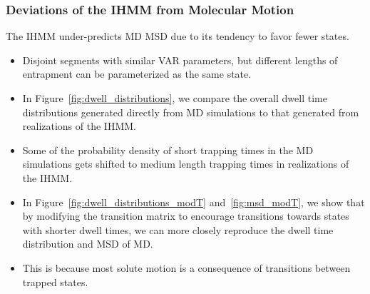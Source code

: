 \documentclass[journal=jpcbfk,manuscript=article]{achemso}
\begin{document}
  \subsubsection*{Deviations of the IHMM from Molecular Motion}
  
  \noindent The IHMM under-predicts MD MSD due to its tendency to favor fewer states.%
  \begin{itemize}
    \item Disjoint segments with similar VAR parameters, but different lengths of 
    entrapment can be parameterized as the same state.
    \item In Figure~\ref{fig:dwell_distributions}, we compare the overall dwell 
    time distributions generated directly from MD simulations to that generated from 
    realizations of the IHMM. 
    \item Some of the probability density of short trapping times in the MD simulations
    gets shifted to medium length trapping times in realizations of the IHMM.
    \item In Figure~\ref{fig:dwell_distributions_modT} and~\ref{fig:msd_modT}, we show 
    that by modifying the transition matrix to encourage transitions towards states with
    shorter dwell times, we can more closely reproduce the dwell time distribution and 
    MSD of MD.
    \item This is because most solute motion is a consequence of transitions between 
    trapped states.
  \end{itemize}
  
\end{document}
